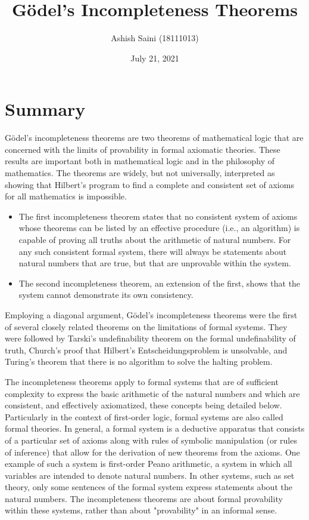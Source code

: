 \documentclass[12pt]{article}
\begin{document}
\title{Gödel's Incompleteness Theorems}
\author{Ashish Saini (18111013)}
\date{July 21, 2021}
\maketitle



\section{Summary}

Gödel's incompleteness theorems are two theorems of mathematical logic that are concerned with the limits of provability in formal axiomatic theories. These results are important both in mathematical logic and in the philosophy of mathematics. The theorems are widely, but not universally, interpreted as showing that Hilbert's program to find a complete and consistent set of axioms for all mathematics is impossible.

\begin{itemize}

\item The first incompleteness theorem states that no consistent system of axioms whose theorems can be listed by an effective procedure (i.e., an algorithm) is capable of proving all truths about the arithmetic of natural numbers. For any such consistent formal system, there will always be statements about natural numbers that are true, but that are unprovable within the system.
\item The second incompleteness theorem, an extension of the first, shows that the system cannot demonstrate its own consistency.

\end{itemize}

Employing a diagonal argument, Gödel's incompleteness theorems were the first of several closely related theorems on the limitations of formal systems. They were followed by Tarski's undefinability theorem on the formal undefinability of truth, Church's proof that Hilbert's Entscheidungsproblem is unsolvable, and Turing's theorem that there is no algorithm to solve the halting problem.   \par

The incompleteness theorems apply to formal systems that are of sufficient complexity to express the basic arithmetic of the natural numbers and which are consistent, and effectively axiomatized, these concepts being detailed below. Particularly in the context of first-order logic, formal systems are also called formal theories. In general, a formal system is a deductive apparatus that consists of a particular set of axioms along with rules of symbolic manipulation (or rules of inference) that allow for the derivation of new theorems from the axioms. One example of such a system is first-order Peano arithmetic, a system in which all variables are intended to denote natural numbers. In other systems, such as set theory, only some sentences of the formal system express statements about the natural numbers. The incompleteness theorems are about formal provability within these systems, rather than about "provability" in an informal sense.
\end{document}
